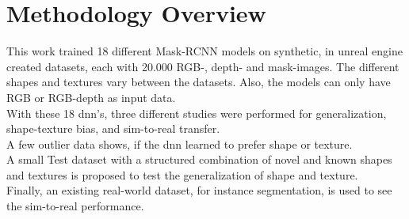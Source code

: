 	
	
	\section{Methodology Overview}
	\label{sec:methodology-overview}
		This work trained 18 different Mask-RCNN \cite{Kaiming2017} models on synthetic, in unreal engine \cite{Romero2022} created datasets, each with 20.000 RGB-, depth- and mask-images. The different shapes and textures vary between the datasets. Also, the models can only have RGB or RGB-depth as input data.\\
		With these 18 \ac{dnn}'s, three different studies were performed for generalization, shape-texture bias, and sim-to-real transfer.\\
		A few outlier data shows, if the \ac{dnn} learned to prefer shape or texture.\\
		A small Test dataset with a structured combination of novel and known shapes and textures is proposed to test the generalization of shape and texture.\\
		Finally, an existing real-world dataset, for instance segmentation, is used to see the sim-to-real performance.
		
	
	

